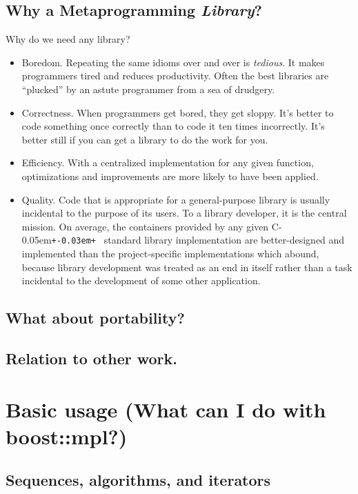 \documentclass{netobjectdays}
\newcommand{\Cpp}{C\kern-0.05em\texttt{+\kern-0.03em+}%
}
\begin{document}
\subsection{Why a Metaprogramming \emph{Library}?}

Why do we need any library? 
\begin{itemize}

\item Boredom. Repeating the same idioms over and over is
  \emph{tedious}. It makes programmers tired and reduces
  productivity. Often the best libraries are ``plucked'' by an astute
  programmer from a sea of drudgery.


\item Correctness. When programmers get bored, they get sloppy. It's
  better to code something once correctly than to code it ten times
  incorrectly. It's better still if you can get a library to do the
  work for you.

\item Efficiency. With a centralized implementation for any given
  function, optimizations and improvements are more likely to have
  been applied.

\item Quality. Code that is appropriate for a general-purpose library
  is usually incidental to the purpose of its users. To a library
  developer, it is the central mission. On average, the containers
  provided by any given \Cpp\ standard library implementation are
  better-designed and implemented than the project-specific
  implementations which abound, because library development was
  treated as an end in itself rather than a task incidental to the
  development of some other application.

\end{itemize}


\subsection{What about portability? }
\subsection{Relation to other work.}

\section{Basic usage (What can I do with boost::mpl?)}
\subsection{Sequences, algorithms, and iterators}
\end{document}
